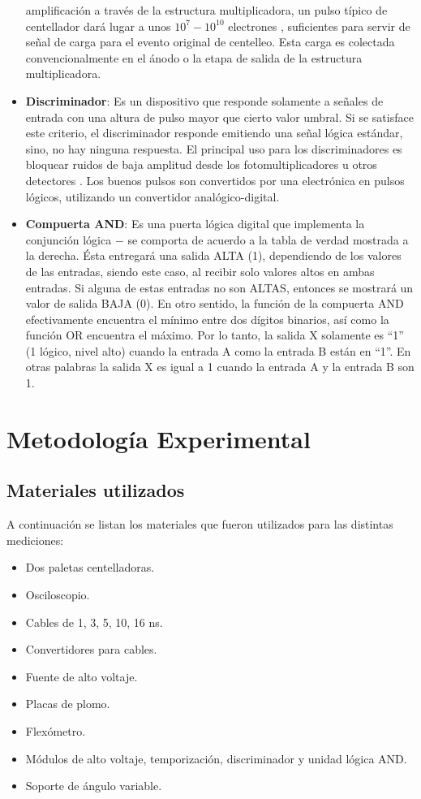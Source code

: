 \documentclass[a4paper,10pt]{article}
\numberwithin{equation}{section}
\begin{document}
\begin{itemize}
 amplificación a través de la estructura multiplicadora, un pulso típico de
 centellador dará lugar a unos $10^7-10^{10}$ electrones \cite{knoll}, suficientes
 para servir de señal de carga para el evento original de centelleo. Esta carga
 es colectada convencionalmente en el ánodo o la etapa de salida de la estructura
 multiplicadora.
 \item \textbf{Discriminador}: Es un dispositivo que responde solamente a señales 
 de entrada con una altura de pulso mayor que cierto valor umbral. Si se satisface 
 este criterio, el discriminador responde emitiendo una señal lógica estándar, sino, 
 no hay ninguna respuesta. El principal uso para los discriminadores es bloquear 
 ruidos de baja amplitud desde los fotomultiplicadores u otros detectores \cite{leo}. Los 
 buenos pulsos son convertidos por una electrónica en pulsos lógicos, utilizando 
 un convertidor analógico-digital.
 \item \textbf{Compuerta AND}: Es una puerta lógica digital que implementa la
 conjunción lógica $-$ se comporta de acuerdo a la tabla de verdad mostrada a la 
 derecha. Ésta entregará una salida ALTA (1), dependiendo de los valores de las 
 entradas, siendo este caso, al recibir solo valores altos en ambas entradas. Si 
 alguna de estas entradas no son ALTAS, entonces se mostrará un valor de salida 
 BAJA (0). En otro sentido, la función de la compuerta AND efectivamente encuentra 
 el mínimo entre dos dígitos binarios, así como la función OR encuentra el máximo.
 Por lo tanto, la salida X solamente es ``1'' (1 lógico, nivel alto) cuando la entrada
 A como la entrada B están en ``1''. En otras palabras la salida X es igual a 1 cuando
 la entrada A y la entrada B son 1.
\end{itemize}


\section{Metodología Experimental}
\label{s:metodologiaexperimental}

\subsection{Materiales utilizados}
\label{ss:materialesutilizados}

A continuación se listan los materiales que fueron utilizados para las distintas mediciones:

\begin{itemize}
 \item Dos paletas centelladoras.
 \item Osciloscopio.
 \item Cables de 1, 3, 5, 10, 16 ns.
 \item Convertidores para cables.
 \item Fuente de alto voltaje.
 \item Placas de plomo.
 \item Flexómetro.
 \item Módulos de alto voltaje, temporización, discriminador y unidad lógica AND.
 \item Soporte de ángulo variable.
\end{itemize}
\end{document}
